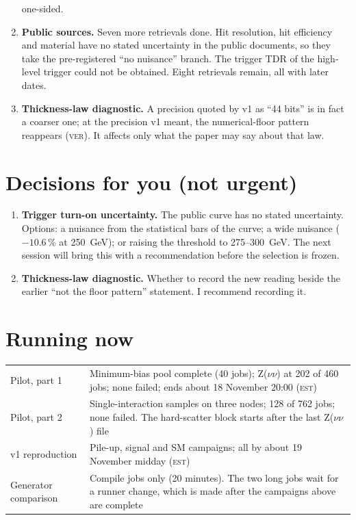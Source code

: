 \documentclass[11pt,a4paper]{article}
\newcommand{\est}{\textsc{est}}
\newcommand{\ver}{\textsc{ver}}
\begin{document}
\begin{enumerate}
      one-sided.
\item \textbf{Public sources.} Seven more retrievals done. Hit resolution, hit efficiency and material have no
      stated uncertainty in the public documents, so they take the pre-registered ``no nuisance'' branch. The
      trigger TDR of the high-level trigger could not be obtained. Eight retrievals remain, all with later dates.
\item \textbf{Thickness-law diagnostic.} A precision quoted by v1 as ``44 bits'' is in fact a coarser one; at the
      precision v1 meant, the numerical-floor pattern reappears (\ver). It affects only what the paper may say about
      that law.
\end{enumerate}

\section{Decisions for you (not urgent)}\label{sec:dec}
\begin{enumerate}
\item \textbf{Trigger turn-on uncertainty.} The public curve has no stated uncertainty. Options: a nuisance from the
      statistical bars of the curve; a wide nuisance ($-10.6\,\%$ at 250~GeV); or raising the threshold to
      275--300~GeV. The next session will bring this with a recommendation before the selection is frozen.
\item \textbf{Thickness-law diagnostic.} Whether to record the new reading beside the earlier ``not the floor
      pattern'' statement. I recommend recording it.
\end{enumerate}

\section{Running now}
\begin{center}
\begin{tabular}{L{3.6cm}L{10.6cm}}
\toprule
Pilot, part 1 & Minimum-bias pool complete (40 jobs); Z($\nu\nu$) at 202 of 460 jobs; none failed; ends about
                18 November 20:00 (\est) \\
Pilot, part 2 & Single-interaction samples on three nodes; 128 of 762 jobs; none failed. The hard-scatter block
                starts after the last Z($\nu\nu$) file \\
v1 reproduction & Pile-up, signal and SM campaigns; all by about 19 November midday (\est) \\
Generator comparison & Compile jobs only (20 minutes). The two long jobs wait for a runner change, which is made
                       after the campaigns above are complete \\
\bottomrule
\end{tabular}
\end{center}
\end{document}
